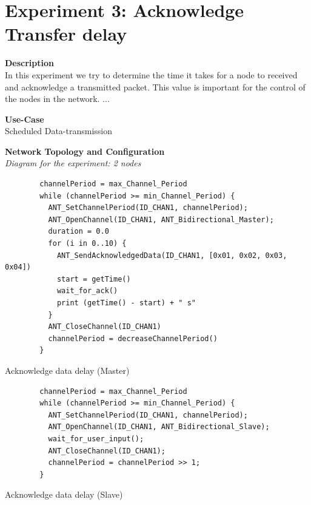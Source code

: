 \section{Experiment 3: Acknowledge Transfer delay}
\begin{description} 
	\item{\textbf{Description}} \hfill \\ In this experiment we try to determine the time it takes for a node to received and acknowledge a transmitted packet. This value is important for the control of the nodes in the network. ...
	\item{\textbf{Use-Case}} \hfill \\ Scheduled Data-transmission
	\item{\textbf{Network Topology and Configuration}} \hfill \\ \textit{Diagram for the experiment:  2 nodes} \\
	\begin{code}
		\begin{verbatim}
		channelPeriod = max_Channel_Period
		while (channelPeriod >= min_Channel_Period) {
		  ANT_SetChannelPeriod(ID_CHAN1, channelPeriod);
		  ANT_OpenChannel(ID_CHAN1, ANT_Bidirectional_Master);
		  duration = 0.0
		  for (i in 0..10) {
		    ANT_SendAcknowledgedData(ID_CHAN1, [0x01, 0x02, 0x03, 0x04])
		    start = getTime()	   
		    wait_for_ack()		
		    print (getTime() - start) + " s"	  
		  }
		  ANT_CloseChannel(ID_CHAN1)		
		  channelPeriod = decreaseChannelPeriod()
		} 
		\end{verbatim}
		\caption{Acknowledge data delay (Master)}\label{lst:mExp3}
	\end{code}
	
	\begin{code}
		\begin{verbatim}
		channelPeriod = max_Channel_Period
		while (channelPeriod >= min_Channel_Period) {
		  ANT_SetChannelPeriod(ID_CHAN1, channelPeriod);
		  ANT_OpenChannel(ID_CHAN1, ANT_Bidirectional_Slave);				 
		  wait_for_user_input();
		  ANT_CloseChannel(ID_CHAN1);
		  channelPeriod = channelPeriod >> 1;
		}
		\end{verbatim}
		\caption{Acknowledge data delay (Slave)}\label{lst:sExp3}
	\end{code}
	

\end{description}
